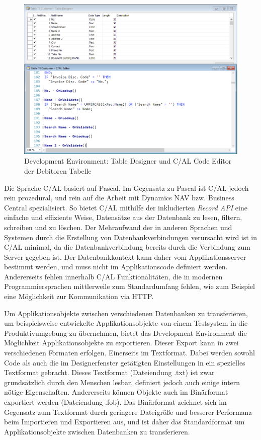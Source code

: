 \begin{figure}[h]
	\centering
	\includegraphics[width=130mm]{images/TableDesigner}
	\caption{Development Environment: Table Designer und C/AL Code Editor der Debitoren Tabelle}
	\label{fig:TableDesignerCodeEditor}
\end{figure}

Die Sprache C/AL basiert auf Pascal. Im Gegensatz zu Pascal ist C/AL jedoch rein prozedural, und rein auf die Arbeit mit Dynamics NAV bzw. Business Central spezialisiert. So bietet C/AL mithilfe der inkludierten \textit{Record API} eine einfache und effiziente Weise, Datensätze aus der Datenbank zu lesen, filtern, schreiben und zu löschen. Der Mehraufwand der in anderen Sprachen und Systemen durch die Erstellung von Datenbankverbindungen verursacht wird ist in C/AL minimal, da die Datenbankverbindung bereits durch die Verbindung zum Server gegeben ist. Der Datenbankkontext kann daher vom Applikationsserver bestimmt werden, und muss nicht im Applikationscode definiert werden. Andererseits fehlen innerhalb C/AL Funktionalitäten, die in modernen Programmiersprachen mittlerweile zum Standardumfang fehlen, wie zum Beispiel eine Möglichkeit zur Kommunikation via HTTP.
\linebreak

Um Applikationsobjekte zwischen verschiedenen Datenbanken zu transferieren, um beispielsweise entwickelte Applikationsobjekte von einem Testsystem in die Produktivumgebung zu übernehmen, bietet das Development Environment die Möglichkeit Applikationsobjekte zu exportieren. Dieser Export kann in zwei verschiedenen Formaten erfolgen. Einerseits im Textformat. Dabei werden sowohl Code als auch die im Designerfenster getätigten Einstellungen in ein spezielles Textformat gebracht. Dieses Textformat (Dateiendung .txt) ist zwar grundsätzlich durch den Menschen lesbar, definiert jedoch auch einige intern nötige Eigenschaften. Andererseits können Objekte auch im Binärformat exportiert werden (Dateiendung .fob). Das Binärformat zeichnet sich im Gegensatz zum Textformat durch geringere Dateigröße und besserer Performanz beim Importieren und Exportieren aus, und ist daher das Standardformat um Applikationsobjekte zwischen Datenbanken zu transferieren.

